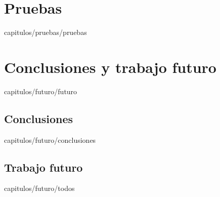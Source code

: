 \documentclass[epsbased,lof,copyright,final,printable,covers,extendedindex,firstnumbered,tfg,gnuplot]{thesis}
\begin{document}
\chapter{Pruebas\label{CAP:PRUEBAS}}{capitulos/pruebas/pruebas}

\chapter{Conclusiones y trabajo futuro\label{CAP:FUTURO}}{capitulos/futuro/futuro}
  \section{Conclusiones\label{SEC:CONCLUSIONES}}{capitulos/futuro/conclusiones}
  \section{Trabajo futuro\label{SEC:TODOS}}{capitulos/futuro/todos}
\end{document}
